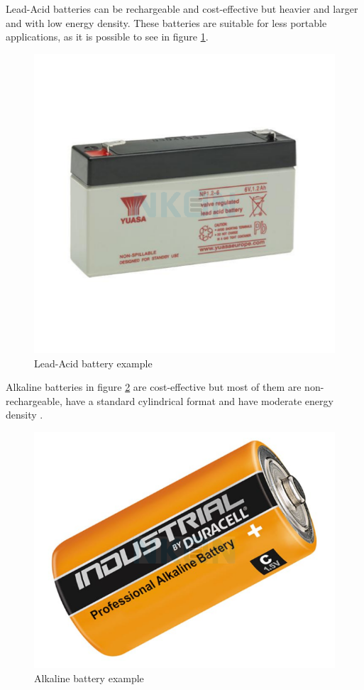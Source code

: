 Lead-Acid batteries can be rechargeable and cost-effective but heavier and larger and with low energy density.
These batteries are suitable for less portable applications, \cite{BATT3} as it is possible to see in figure \ref{fig:lead}.
\begin{figure}[H]
    \centering
    \includegraphics[scale=0.4]{ch3/assets/lead.png}
    \caption{Lead-Acid battery example \cite{lead}}
    \label{fig:lead}
\end{figure}


Alkaline batteries in figure \ref{fig:alkaline} are cost-effective but most of them are non-rechargeable, have a standard cylindrical format and have moderate energy density \cite{BATT3}.
\begin{figure}[H]
    \centering
    \includegraphics[scale=0.3]{ch3/assets/alkaline.png}
    \caption{Alkaline battery example \cite{alkaline}}
    \label{fig:alkaline}
\end{figure}


